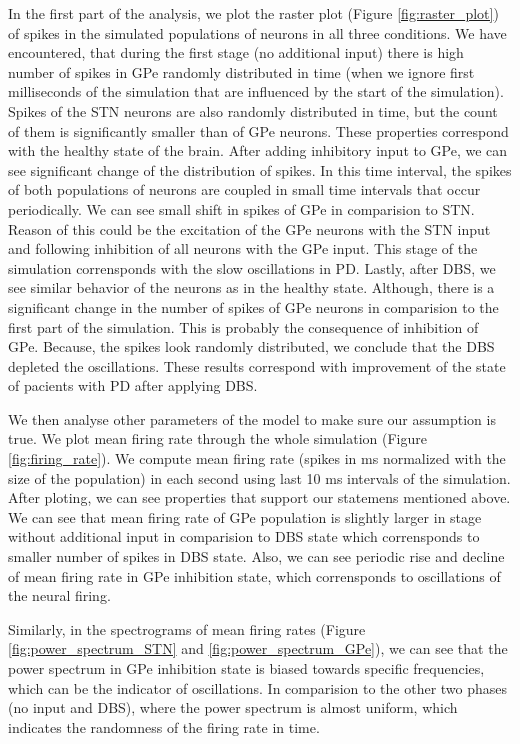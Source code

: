 \documentclass[11pt]{article}
\begin{document}
In the first part of the analysis, we plot the raster plot (Figure \ref{fig:raster_plot}) 
of spikes in the simulated populations of neurons in all three conditions. 
We have encountered, that during the first stage (no additional input)
there is high number of 
spikes in GPe randomly distributed in time (when we ignore first milliseconds of the 
simulation that are influenced by the start of the simulation). Spikes of the 
STN neurons are also randomly distributed in time, but the count of them is 
significantly smaller than of GPe neurons. These properties correspond 
with the healthy state of the brain. 
After adding inhibitory
input to GPe, we can see significant change of the distribution of spikes. In this time
interval, the spikes of both populations of neurons are coupled in small time intervals
that occur periodically. We can see small shift in spikes of GPe in comparision to STN.
Reason of this could be the excitation of the GPe neurons with the STN input and following
inhibition of all neurons with the GPe input. This stage of the simulation corrensponds
with the slow oscillations in PD. 
Lastly, after DBS, we see similar behavior of the neurons as in the healthy state. 
Although, there is a significant change in the number of 
spikes of GPe neurons in comparision to the first part of the simulation. This is probably 
the consequence of inhibition of GPe. Because, the spikes look randomly distributed, we
conclude that the DBS depleted the oscillations. These results correspond with 
improvement of the state of pacients with PD after applying DBS.

We then analyse other parameters of the model to make sure our assumption is true.
We plot mean firing rate through the whole simulation (Figure \ref{fig:firing_rate}).
We compute mean firing rate (spikes in ms normalized with the size of the population) in 
each second using last 10 ms intervals of the simulation. After ploting, we can see properties
that support our statemens mentioned above. We can see that mean firing rate of 
GPe population is slightly larger in stage without additional input in comparision 
to DBS state which corrensponds to smaller number of spikes in DBS state. Also, we can
see periodic rise and decline of mean firing rate in GPe inhibition state, which
corrensponds to oscillations of the neural firing.

Similarly, in the spectrograms of mean firing rates 
(Figure \ref{fig:power_spectrum_STN} and \ref{fig:power_spectrum_GPe}), 
we can see that the power spectrum in GPe inhibition
state is biased towards specific frequencies, which can be the indicator of oscillations.
In comparision to the other two phases (no input and DBS), where the power spectrum is 
almost uniform, which indicates the randomness of the firing rate in time.
\end{document}
